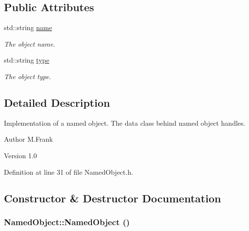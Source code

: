 \subsection*{Public Attributes}
\begin{DoxyCompactItemize}
\item 
std::string \hyperlink{class_d_d4hep_1_1_named_object_a4675ccdc57835ec27eef8f2799eb77a2}{name}
\begin{DoxyCompactList}\small\item\em The object name. \item\end{DoxyCompactList}\item 
std::string \hyperlink{class_d_d4hep_1_1_named_object_a8e17bb5f854b320302be44c68c39a192}{type}
\begin{DoxyCompactList}\small\item\em The object type. \item\end{DoxyCompactList}\end{DoxyCompactItemize}


\subsection{Detailed Description}
Implementation of a named object. The data class behind named object handles.

\begin{DoxyAuthor}{Author}
M.Frank 
\end{DoxyAuthor}
\begin{DoxyVersion}{Version}
1.0 
\end{DoxyVersion}


Definition at line 31 of file NamedObject.h.

\subsection{Constructor \& Destructor Documentation}
\hypertarget{class_d_d4hep_1_1_named_object_a210152aa261bc94e2012f6a0242faae0}{
\subsubsection[{NamedObject}]{\setlength{\rightskip}{0pt plus 5cm}NamedObject::NamedObject ()}}
\label{class_d_d4hep_1_1_named_object_a210152aa261bc94e2012f6a0242faae0}



